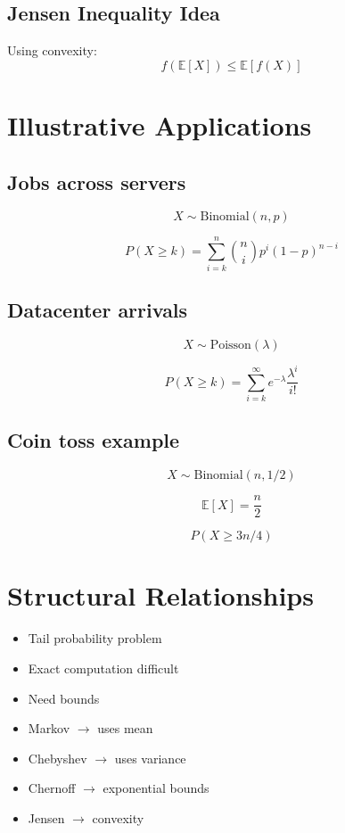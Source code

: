 \documentclass[12pt]{article}
\begin{document}
\subsection{Jensen Inequality Idea}

Using convexity:
\[
f(\mathbb{E}[X]) \le \mathbb{E}[f(X)]
\]

\section{Illustrative Applications}

\subsection{Jobs across servers}
\[
X \sim \text{Binomial}(n,p)
\]

\[
P(X \ge k) = \sum_{i=k}^{n} \binom{n}{i} p^i (1-p)^{n-i}
\]

\subsection{Datacenter arrivals}
\[
X \sim \text{Poisson}(\lambda)
\]

\[
P(X \ge k) = \sum_{i=k}^{\infty} e^{-\lambda} \frac{\lambda^i}{i!}
\]

\subsection{Coin toss example}

\[
X \sim \text{Binomial}(n, 1/2)
\]

\[
\mathbb{E}[X] = \frac{n}{2}
\]

\[
P(X \ge 3n/4)
\]

\section{Structural Relationships}

\begin{itemize}
\item Tail probability problem
\item Exact computation difficult
\item Need bounds
\item Markov $\rightarrow$ uses mean
\item Chebyshev $\rightarrow$ uses variance
\item Chernoff $\rightarrow$ exponential bounds
\item Jensen $\rightarrow$ convexity
\end{itemize}
\end{document}
